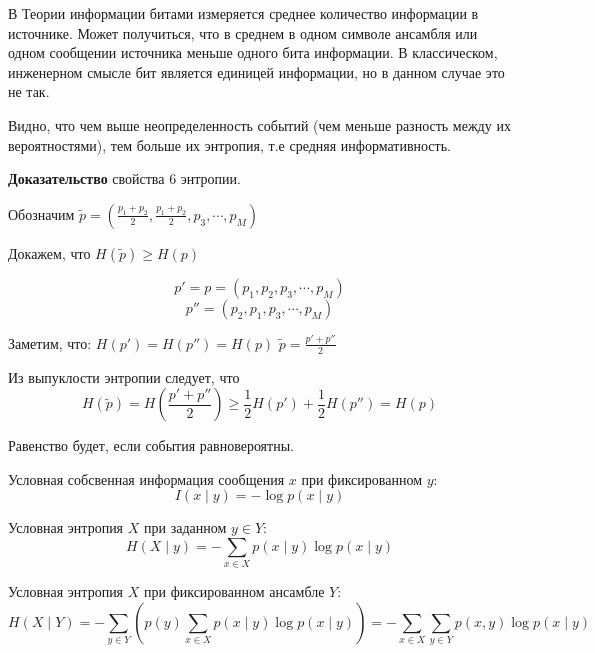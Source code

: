 В Теории информации битами измеряется среднее количество информации в источнике.
Может получиться, что в среднем в одном символе ансамбля или одном сообщении
источника меньше одного бита информации. В классическом, инженерном смысле бит
является единицей информации, но в данном случае это не так.

Видно, что чем выше неопределенность событий (чем меньше разность между их
вероятностями), тем больше их энтропия, т.е средняя информативность.

\textbf{Доказательство} свойства 6 энтропии.

Обозначим $\tilde p = (\frac{p_1 + p_2}{2}, \frac{p_1 + p_2}{2}, p_3, \cdots,
p_M)$

Докажем, что $H(\tilde p) \geq H(p)$

\[
    p' = p = (p_1, p_2, p_3, \cdots, p_M)
\]
\[
    p'' = (p_2, p_1, p_3, \cdots, p_M)
\]

Заметим, что: $H(p') = H(p'') = H(p)$
$\tilde p = \frac{p' + p''}{2}$

Из выпуклости энтропии следует, что
\[
    H(\tilde p) = H \left( \frac{p' + p''}{2} \right) \geq
    \frac{1}{2}H(p') + \frac{1}{2}H(p'') = H(p)
\]

Равенство будет, если события равновероятны.

Условная собсвенная информация сообщения $x$ при фиксированном $y$:
\[
    I(x \mid y) = - \log p(x \mid y)
\]

Условная энтропия $X$ при заданном $y \in Y$:
\[
    H(X \mid y) = - \sum_{x \in X} p(x \mid y) \log p(x \mid y)
\]

Условная энтропия $X$ при фиксированном ансамбле $Y$:
\[
    H(X \mid Y) = - \sum_{y \in Y} \left( p(y) \sum_{x \in X} p(x \mid y) \log
    p(x \mid y) \right) = - \sum_{x \in X} \sum_{y \in Y} p(x, y) \log p(x \mid
    y)
\]

